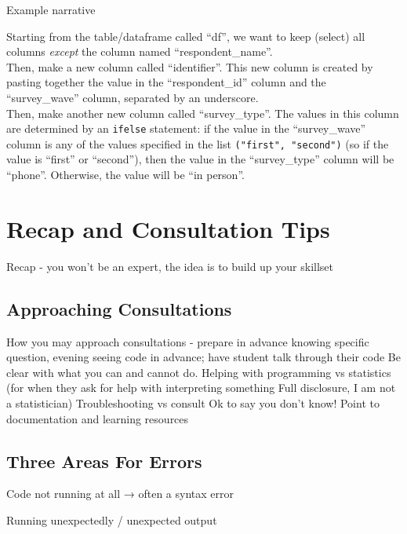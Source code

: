 \documentclass[
]{book}
\begin{document}
Example narrative

Starting from the table/dataframe called ``df'', we want to keep (select) all columns \emph{except} the column named ``respondent\_name''.\\

Then, make a new column called ``identifier''. This new column is created by pasting together the value in the ``respondent\_id'' column and the ``survey\_wave'' column, separated by an underscore.\\

Then, make another new column called ``survey\_type''. The values in this column are determined by an \texttt{ifelse} statement: if the value in the ``survey\_wave'' column is any of the values specified in the list \texttt{("first",\ "second")} (so if the value is ``first'' or ``second''), then the value in the ``survey\_type'' column will be ``phone''. Otherwise, the value will be ``in person''.\\

\hfill\break

\chapter{Recap and Consultation Tips}\label{recap-and-consultation-tips}

Recap - you won't be an expert, the idea is to build up your skillset

\section{Approaching Consultations}\label{approaching-consultations}

How you may approach consultations - prepare in advance knowing specific question, evening seeing code in advance; have student talk through their code
Be clear with what you can and cannot do.
Helping with programming vs statistics (for when they ask for help with interpreting something Full disclosure, I am not a statistician)
Troubleshooting vs consult
Ok to say you don't know! Point to documentation and learning resources

\section{Three Areas For Errors}\label{three-areas-for-errors}

Code not running at all → often a syntax error

Running unexpectedly / unexpected output
\end{document}
